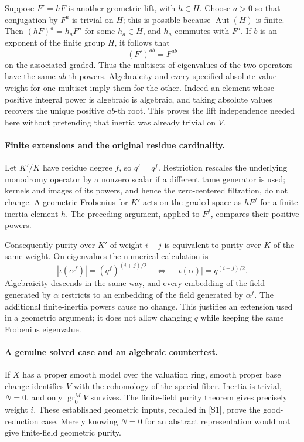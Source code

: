 \documentclass[11pt]{article}
\begin{document}
Suppose $F'=hF$ is another geometric lift, with $h\in H$. Choose
$a>0$ so that conjugation by $F^a$ is trivial on $H$; this is possible
because $\operatorname{Aut}(H)$ is finite. Then
$(hF)^a=h_aF^a$ for some $h_a\in H$, and $h_a$ commutes with $F^a$.
If $b$ is an exponent of the finite group $H$, it follows that
\[
 (F')^{ab}=F^{ab}
\]
on the associated graded. Thus the multisets of eigenvalues of the
two operators have the same $ab$-th powers. Algebraicity and every
specified absolute-value weight for one multiset imply them for the
other. Indeed an element whose positive integral power is algebraic
is algebraic, and taking absolute values recovers the unique positive
$ab$-th root. This proves the lift independence needed here without
pretending that inertia was already trivial on $V$.

\paragraph{Finite extensions and the original residue cardinality.}
Let $K'/K$ have residue degree $f$, so $q'=q^f$. Restriction rescales
the underlying monodromy operator by a nonzero scalar if a different
tame generator is used; kernels and images of its powers, and hence
the zero-centered filtration, do not change. A geometric Frobenius
for $K'$ acts on the graded space as $hF^f$ for a finite inertia
element $h$. The preceding argument, applied to $F^f$, compares their
positive powers.

Consequently purity over $K'$ of weight $i+j$ is equivalent to purity
over $K$ of the same weight. On eigenvalues the numerical calculation is
\[
 |\iota(\alpha^f)|=(q^f)^{(i+j)/2}
 \quad\Longleftrightarrow\quad
 |\iota(\alpha)|=q^{(i+j)/2}.
\]
Algebraicity descends in the same way, and every embedding of the field
generated by $\alpha$ restricts to an embedding of the field generated
by $\alpha^f$. The additional finite-inertia powers cause no change.
This justifies an extension used in a geometric argument; it does not
allow changing $q$ while keeping the same Frobenius eigenvalue.

\paragraph{A genuine solved case and an algebraic countertest.}
If $X$ has a proper smooth model over the valuation ring, smooth proper
base change identifies $V$ with the cohomology of the special fiber.
Inertia is trivial, $N=0$, and only $\operatorname{gr}_0^M V$ survives.
The finite-field purity theorem gives precisely weight $i$. These
established geometric inputs, recalled in [S1], prove the good-reduction
case. Merely knowing $N=0$ for an abstract representation would not
give finite-field geometric purity.
\end{document}
